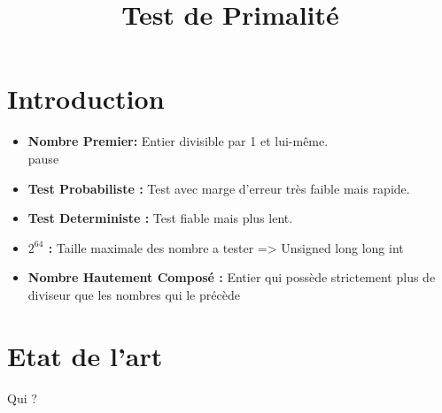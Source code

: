 
\usepackage{../tex/myInfolines}
\usepackage{longtable,array}
\title{Test de Primalité}


	\begin{frame}
		\titlepage
	\end{frame}
	
	\section*{Introduction}
        \begin{frame}
            \begin{itemize}
            \item \textbf{Nombre Premier:} Entier divisible par 1 et lui-même.\\pause
            \vspace{1em}            
            \item \textbf{Test Probabiliste :} Test avec marge d'erreur très faible mais rapide.  \\
            \vspace{1em}
            \item \textbf{ Test Deterministe :} Test fiable mais plus lent.    \\
            \vspace{1em}
            \item \textbf{$2^{64}$ :} Taille maximale des nombre a tester => Unsigned long long int  \\
            \vspace{1em}
            \item \textbf{Nombre Hautement Composé :} Entier qui possède strictement plus de diviseur que les nombres qui le précède\\
            \end{itemize}            
        \end{frame}
	
	\begin{frame}
		\tableofcontents
	\end{frame}
	
	\section{Etat de l'art}
		\begin{frame}
	Qui ?
		\end{frame}
		
